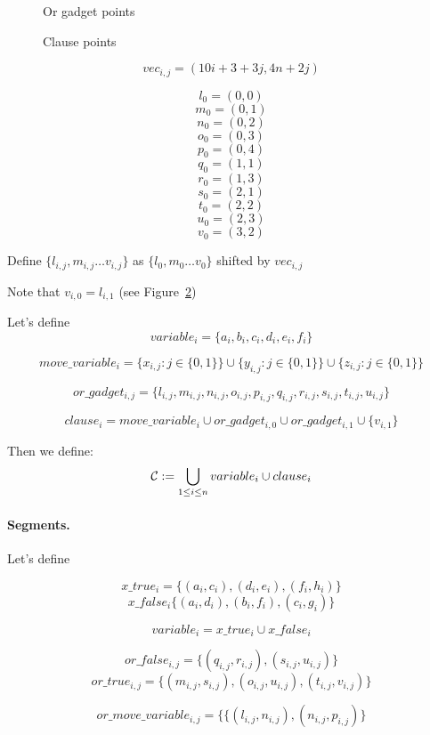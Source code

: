 	
	
\begin{figure}[h]
\centering
\def\svgwidth{0.5\columnwidth}

\caption{Or gadget points}
\label{fig:apx_or_gadget}
\end{figure}


\begin{figure}[h]
\centering
\def\svgwidth{0.8\columnwidth}

\caption{Clause points}
\label{fig:apx_clause}
\end{figure}
	$$vec_{i, j} = (10i + 3 + 3j, 4n + 2j)$$
	
	$$l_0 = (0, 0)$$
	$$m_0 = (0, 1)$$
	$$n_0 = (0, 2)$$
	$$o_0 = (0, 3)$$
	$$p_0 = (0, 4)$$
	$$q_0 = (1, 1)$$
	$$r_0 = (1, 3)$$
	$$s_0 = (2, 1)$$
	$$t_0 = (2, 2)$$
	$$u_0 = (2, 3)$$
	$$v_0 = (3, 2)$$
	
	
	Define 
	$\{ l_{i, j}, m_{i, j} \ldots v_{i, j} \}$
	as $\{l_0, m_0 \ldots v_0\}$ shifted by $vec_{i, j}$

Note that $v_{i, 0} = l_{i, 1}$ (see Figure~\ref{fig:apx_clause})

Let's define $$variable_i =  \{a_i, b_i, c_i, d_i, e_i, f_i\}$$	
 
 $$move\_variable_i = 
 \{x_{i, j} : j \in \{0, 1\}\} \cup
 \{y_{i, j} : j \in \{0, 1\}\} \cup
 \{z_{i, j} : j \in \{0, 1\}\} 
 $$
 
 $$or\_gadget_{i, j} = 
 \{l_{i, j}, m_{i, j}, n_{i, j}, o_{i, j},
 p_{i, j}, q_{i, j}, r_{i, j}, s_{i, j}, t_{i, j}, u_{i, j} \}
 $$
 
 $$clause_i = 
 move\_variable_i \cup or\_gadget_{i, 0} \cup or\_gadget_{i, 1} \cup \{v_{i, 1} \} 
 $$
 

Then we define:
$$\mathcal{C} := \bigcup_{1 \le i \le n} variable_i \cup clause_i $$


\paragraph{Segments.}

Let's define 

$$x\_true_i = \{(a_i, c_i), (d_i, e_i), (f_i, h_i)\}$$
$$x\_false_i \{ (a_i, d_i), (b_i, f_i), (c_i, g_i)\}$$

$$variable_i = x\_true_i \cup x\_false_i$$

$$or\_false_{i, j} = \{ (q_{i, j}, r_{i, j}), (s_{i, j}, u_{i, j})\}$$
$$or\_true_{i, j} = \{ (m_{i, j}, s_{i, j}), (o_{i, j}, u_{i, j}),(t_{i, j}, v_{i, j}) \}$$

$$or\_move\_variable_{i, j} = \{ \{ (l_{i, j}, n_{i, j}), (n_{i, j}, p_{i, j})\}$$

